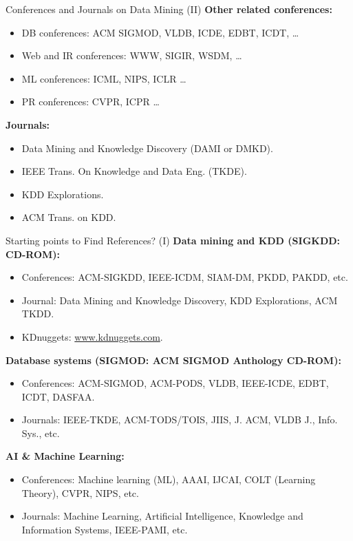 \begin{frame}{Conferences and Journals on Data Mining (II)}
	\textbf{Other related conferences:}
	\begin{itemize}
		\item DB conferences: ACM SIGMOD, VLDB, ICDE, EDBT, ICDT, \ldots
		\item Web and IR conferences: WWW, SIGIR, WSDM, \ldots
		\item ML conferences: ICML, NIPS, ICLR \ldots
		\item PR conferences: CVPR, ICPR \ldots
	\end{itemize}
	\textbf{Journals:}
	\begin{itemize}
		\item Data Mining and Knowledge Discovery (DAMI or DMKD).
		\item IEEE Trans. On Knowledge and Data Eng. (TKDE).
		\item KDD Explorations.
		\item ACM Trans. on KDD.
	\end{itemize}
\end{frame}

\begin{frame}{Starting points to Find References? (I)}
	\textbf{Data mining and KDD (SIGKDD: CD-ROM):}
	\begin{itemize}
		\item Conferences: ACM-SIGKDD, IEEE-ICDM, SIAM-DM, PKDD, PAKDD, etc.
		\item Journal: Data Mining and Knowledge Discovery, KDD Explorations,
		      ACM TKDD.
		\item KDnuggets: \url{www.kdnuggets.com}.
	\end{itemize}
	\textbf{Database systems (SIGMOD: ACM SIGMOD Anthology CD-ROM):}
	\begin{itemize}
		\item Conferences: ACM-SIGMOD, ACM-PODS, VLDB, IEEE-ICDE, EDBT, ICDT,
		      DASFAA.
		\item Journals: IEEE-TKDE, ACM-TODS/TOIS, JIIS, J. ACM, VLDB J., Info.
		      Sys., etc.
	\end{itemize}
	\textbf{AI \& Machine Learning:}
	\begin{itemize}
		\item Conferences: Machine learning (ML), AAAI, IJCAI, COLT (Learning
		      Theory), CVPR, NIPS, etc.
		\item Journals: Machine Learning, Artificial Intelligence, Knowledge
		      and Information Systems, IEEE-PAMI, etc.
	\end{itemize}
\end{frame}

